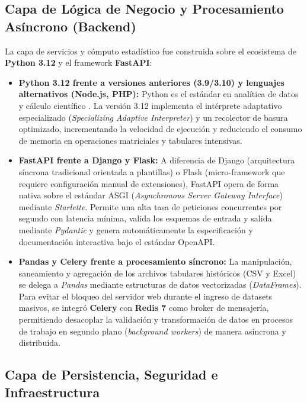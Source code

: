\subsection{Capa de Lógica de Negocio y Procesamiento Asíncrono (Backend)}

La capa de servicios y cómputo estadístico fue construida sobre el ecosistema de \textbf{Python 3.12} y el framework \textbf{FastAPI}:
\begin{itemize}
    \item \textbf{Python 3.12 frente a versiones anteriores (3.9/3.10) y lenguajes alternativos (Node.js, PHP):} Python es el estándar en analítica de datos y cálculo científico \cite{python2024}. La versión 3.12 implementa el intérprete adaptativo especializado (\textit{Specializing Adaptive Interpreter}) y un recolector de basura optimizado, incrementando la velocidad de ejecución y reduciendo el consumo de memoria en operaciones matriciales y tabulares intensivas.
    \item \textbf{FastAPI frente a Django y Flask:} A diferencia de Django (arquitectura síncrona tradicional orientada a plantillas) o Flask (micro-framework que requiere configuración manual de extensiones), FastAPI \cite{ramirez2024} opera de forma nativa sobre el estándar ASGI (\textit{Asynchronous Server Gateway Interface}) mediante \textit{Starlette}. Permite una alta tasa de peticiones concurrentes por segundo con latencia mínima, valida los esquemas de entrada y salida mediante \textit{Pydantic} y genera automáticamente la especificación y documentación interactiva bajo el estándar OpenAPI.
    \item \textbf{Pandas y Celery frente a procesamiento síncrono:} La manipulación, saneamiento y agregación de los archivos tabulares históricos (CSV y Excel) se delega a \textit{Pandas} \cite{mckinney2010, mckinney2022} mediante estructuras de datos vectorizadas (\textit{DataFrames}). Para evitar el bloqueo del servidor web durante el ingreso de datasets masivos, se integró \textbf{Celery} \cite{solem2024} con \textbf{Redis 7} \cite{carlson2013} como broker de mensajería, permitiendo desacoplar la validación y transformación de datos en procesos de trabajo en segundo plano (\textit{background workers}) de manera asíncrona y distribuida.
\end{itemize}

\subsection{Capa de Persistencia, Seguridad e Infraestructura}

